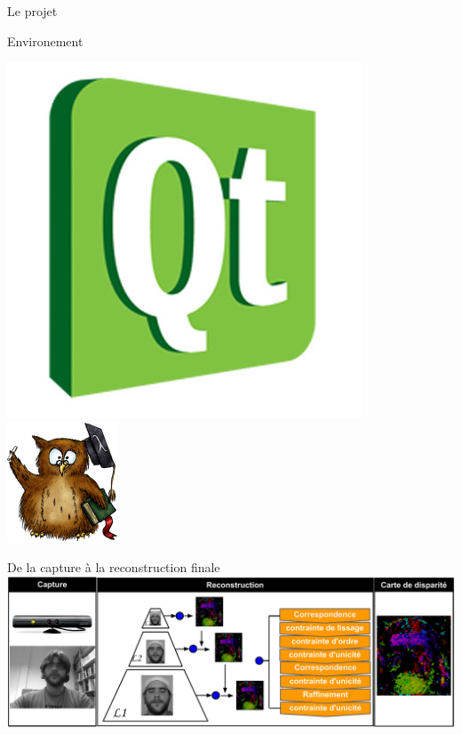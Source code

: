 \documentclass[compress,pdf,11pt,xcolor=dvipsnames]{beamer}
\begin{document}
\begin{frame}{Le projet}
\begin{greyblock}{Environement}
\begin{center}
      \includegraphics[scale=0.1]{img/qt}
      \hspace{3mm}
      \includegraphics[scale=0.3]{img/eigen}
    \end{center}
  \end{greyblock}

    
\end{frame}

\begin{frame}{De la capture à la reconstruction finale}
    \includegraphics[width=\textwidth]{img/projSystem}
\end{frame}
\end{document}
